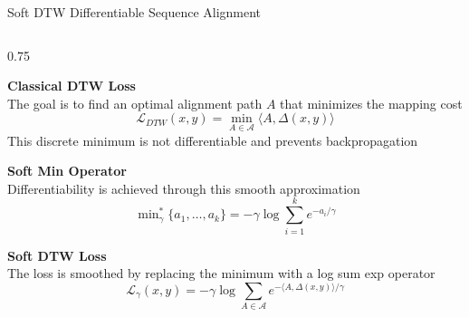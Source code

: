 \begin{frame}[t]{Soft DTW Differentiable Sequence Alignment}
  \vspace{-15pt}

  \begin{columns}[T]

    \begin{column}{0.75\textwidth}

      \textbf{Classical DTW Loss \cite{sakoe1978dtw}} \\[4pt]
      \footnotesize
      The goal is to find an optimal alignment path $A$ that minimizes the mapping cost
      \[
        \mathcal{L}_{DTW}(x, y) = \min_{A \in \mathcal{A}} \langle A, \Delta(x, y) \rangle
      \]
      This discrete minimum is not differentiable and prevents backpropagation

      \vspace{15pt}

      \normalsize\textbf{Soft Min Operator} \\[4pt]
      \footnotesize
      Differentiability is achieved through this smooth approximation
      \[
        \min\nolimits_{\gamma}^\ast \{a_1, \dots, a_k\} = -\gamma \log \sum_{i=1}^k e^{-a_i/\gamma}
      \]

      \vspace{-5pt}

      \normalsize\textbf{Soft DTW Loss \cite{cuturi2017sdtw}} \\[4pt]
      \footnotesize
      The loss is smoothed by replacing the minimum with a log sum exp operator
      \[
        \mathcal{L}_{\gamma}(x, y) = -\gamma \log \sum_{A \in \mathcal{A}} e^{-\langle A, \Delta(x, y) \rangle / \gamma}
      \]

    \end{column}

  \end{columns}
\end{frame}

